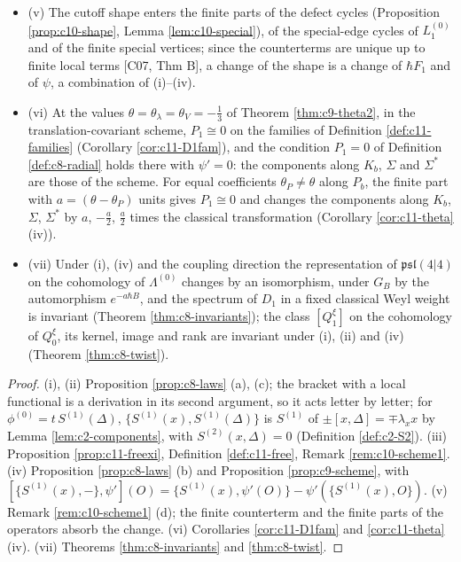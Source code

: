 \begin{proposition}
\begin{itemize}
\item (v) The cutoff shape enters the finite parts of the defect cycles (Proposition \ref{prop:c10-shape}, Lemma \ref{lem:c10-special}), of the special-edge cycles of $L_1^{(0)}$ and of the finite special vertices; since the counterterms are unique up to finite local terms [C07, Thm B], a change of the shape is a change of $\hbar F_1$ and of $\psi$, a combination of (i)--(iv).
\item (vi) At the values $\theta=\theta_\lambda=\theta_V=-\tfrac13$ of Theorem \ref{thm:c9-theta2}, in the translation-covariant scheme, $P_1\cong0$ on the families of Definition \ref{def:c11-families} (Corollary \ref{cor:c11-D1fam}), and the condition $P_1=0$ of Definition \ref{def:c8-radial} holds there with $\psi'=0$: the components along $K_b$, $\Sigma$ and $\Sigma^*$ are those of the scheme. For equal coefficients $\theta_P\ne\theta$ along $P_b$, the finite part with $a=(\theta-\theta_P)$ units gives $P_1\cong0$ and changes the components along $K_b$, $\Sigma$, $\Sigma^*$ by $a$, $-\tfrac a2$, $\tfrac a2$ times the classical transformation (Corollary \ref{cor:c11-theta} (iv)).
\item (vii) Under (i), (iv) and the coupling direction the representation of $\mathfrak{psl}(4|4)$ on the cohomology of $\Lambda^{(0)}$ changes by an isomorphism, under $G_B$ by the automorphism $e^{-a\hbar B}$, and the spectrum of $D_1$ in a fixed classical Weyl weight is invariant (Theorem \ref{thm:c8-invariants}); the class $[Q^\xi_1]$ on the cohomology of $Q^\xi_0$, its kernel, image and rank are invariant under (i), (ii) and (iv) (Theorem \ref{thm:c8-twist}).
\end{itemize}
\end{proposition}

\begin{proof}
(i), (ii) Proposition \ref{prop:c8-laws} (a), (c); the bracket with a local functional is a derivation in its second argument, so it acts letter by letter; for $\phi^{(0)}=t\,S^{(1)}(\Delta)$, $\{S^{(1)}(x),S^{(1)}(\Delta)\}$ is $S^{(1)}$ of $\pm[x,\Delta]=\mp\lambda_xx$ by Lemma \ref{lem:c2-components}, with $S^{(2)}(x,\Delta)=0$ (Definition \ref{def:c2-S2}). (iii) Proposition \ref{prop:c11-freexi}, Definition \ref{def:c11-free}, Remark \ref{rem:c10-scheme1}. (iv) Proposition \ref{prop:c8-laws} (b) and Proposition \ref{prop:c9-scheme}, with $[\{S^{(1)}(x),-\},\psi'](O)=\{S^{(1)}(x),\psi'(O)\}-\psi'(\{S^{(1)}(x),O\})$. (v) Remark \ref{rem:c10-scheme1} (d); the finite counterterm and the finite parts of the operators absorb the change. (vi) Corollaries \ref{cor:c11-D1fam} and \ref{cor:c11-theta} (iv). (vii) Theorems \ref{thm:c8-invariants} and \ref{thm:c8-twist}.
\end{proof}

